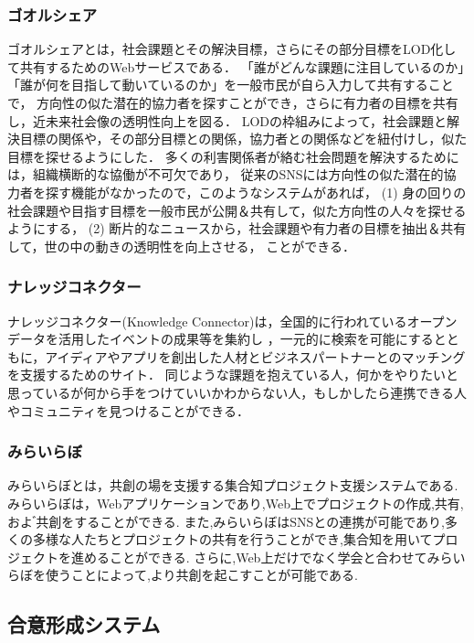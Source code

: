 \subsubsection{ゴオルシェア}
ゴオルシェア\cite{shiramatsu2016}とは，社会課題とその解決目標，さらにその部分目標をLOD化して共有するためのWebサービスである．
「誰がどんな課題に注目しているのか」「誰が何を目指して動いているのか」を一般市民が自ら入力して共有することで，
方向性の似た潜在的協力者を探すことができ，さらに有力者の目標を共有し，近未来社会像の透明性向上を図る．
LODの枠組みによって，社会課題と解決目標の関係や，その部分目標との関係，協力者との関係などを紐付けし，似た目標を探せるようにした．
多くの利害関係者が絡む社会問題を解決するためには，組織横断的な協働が不可欠であり，
従来のSNSには方向性の似た潜在的協力者を探す機能がなかったので，このようなシステムがあれば，
(1) 身の回りの社会課題や目指す目標を一般市民が公開＆共有して，似た方向性の人々を探せるようにする，
(2) 断片的なニュースから，社会課題や有力者の目標を抽出＆共有して，世の中の動きの透明性を向上させる，
ことができる．

\subsubsection{ナレッジコネクター}
ナレッジコネクター(Knowledge Connector)は，全国的に行われているオープンデータを活用したイベントの成果等を集約し
，一元的に検索を可能にするとともに，アイディアやアプリを創出した人材とビジネスパートナーとのマッチングを支援するためのサイト．
同じような課題を抱えている人，何かをやりたいと思っているが何から手をつけていいかわからない人，もしかしたら連携できる人やコミュニティを見つけることができる．

\subsubsection{みらいらぼ}
みらいらぼ\cite{sengoku2016}とは，共創の場を支援する集合知プロジェクト支援システムである.
みらいらぼは，Webアプリケーションであり,Web上でプロジェクトの作成,共有,およ ゙共創をすることができる.
また,みらいらぼはSNSとの連携が可能であり,多くの多様な人たちとプロジェクトの共有を行うことができ,集合知を用いてプロジェクトを進めることができる.
さらに,Web上だけでなく学会と合わせてみらいらぼを使うことによって,より共創を起こすことが可能である.

\subsection{合意形成システム}

